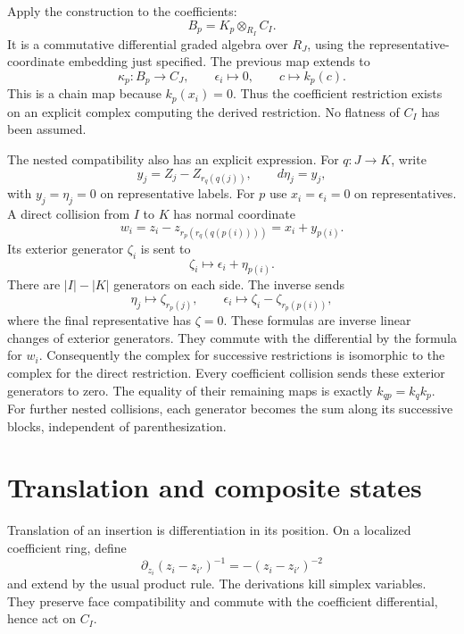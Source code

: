 Apply the construction to the coefficients:
\[
 B_p=K_p\otimes_{R_I}C_I.
\]
It is a commutative differential graded algebra over $R_J$,
using the representative-coordinate embedding just specified.
The previous map extends to
\begin{equation}\label{eq:moi-derived-coefficient}
 \kappa_p:B_p\longrightarrow C_J,\qquad
 \epsilon_i\longmapsto0,\qquad c\longmapsto k_p(c).
\end{equation}
This is a chain map because $k_p(x_i)=0$.
Thus the coefficient restriction exists on an explicit complex
computing the derived restriction. No flatness of $C_I$ has been
assumed.

The nested compatibility also has an explicit expression.
For $q:J\to K$, write
\[
 y_j=Z_j-Z_{r_q(q(j))},\qquad d\eta_j=y_j,
\]
with $y_j=\eta_j=0$ on representative labels.
For $p$ use $x_i=\epsilon_i=0$ on representatives.
A direct collision from $I$ to $K$ has normal coordinate
\[
 w_i=z_i-z_{r_p(r_q(q(p(i))))}=x_i+y_{p(i)}.
\]
Its exterior generator $\zeta_i$ is sent to
\begin{equation}\label{eq:moi-koszul-composition}
 \zeta_i\longmapsto\epsilon_i+\eta_{p(i)}.
\end{equation}
There are $|I|-|K|$ generators on each side.
The inverse sends
\[
 \eta_j\longmapsto\zeta_{r_p(j)},\qquad
 \epsilon_i\longmapsto\zeta_i-\zeta_{r_p(p(i))},
\]
where the final representative has $\zeta=0$.
These formulas are inverse linear changes of exterior generators.
They commute with the differential by the formula for $w_i$.
Consequently the complex for successive restrictions is
isomorphic to the complex for the direct restriction.
Every coefficient collision sends these exterior generators to zero.
The equality of their remaining maps is exactly $k_{qp}=k_qk_p$.
For further nested collisions, each generator becomes the sum along
its successive blocks, independent of parenthesization.

\section{Translation and composite states}

Translation of an insertion is differentiation in its position.
On a localized coefficient ring, define
\[
 \partial_{z_i}(z_i-z_{i'})^{-1}
 =-(z_i-z_{i'})^{-2}
\]
and extend by the usual product rule.
The derivations kill simplex variables.
They preserve face compatibility and commute with the coefficient
differential, hence act on $C_I$.

